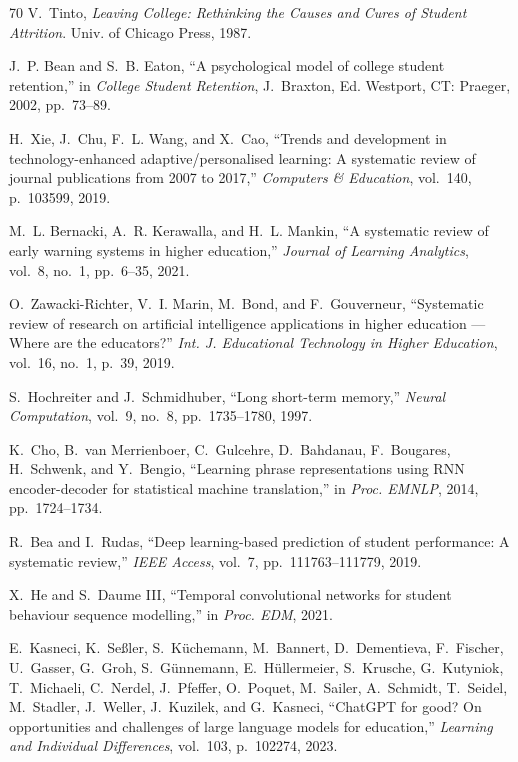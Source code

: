 \begin{thebibliography}{70}
V.~Tinto,
\textit{Leaving College: Rethinking the Causes and Cures of Student Attrition}.
Univ. of Chicago Press, 1987.

J.~P. Bean and S.~B. Eaton,
``A psychological model of college student retention,''
in \textit{College Student Retention}, J.~Braxton, Ed.
Westport, CT: Praeger, 2002, pp.~73--89.

H.~Xie, J.~Chu, F.~L. Wang, and X.~Cao,
``Trends and development in technology-enhanced adaptive/personalised learning: A systematic review of journal publications from 2007 to 2017,''
\textit{Computers \& Education}, vol.~140, p.~103599, 2019.

M.~L. Bernacki, A.~R. Kerawalla, and H.~L. Mankin,
``A systematic review of early warning systems in higher education,''
\textit{Journal of Learning Analytics}, vol.~8, no.~1, pp.~6--35, 2021.

O.~Zawacki-Richter, V.~I. Marin, M.~Bond, and F.~Gouverneur,
``Systematic review of research on artificial intelligence applications in higher education — Where are the educators?''
\textit{Int. J. Educational Technology in Higher Education}, vol.~16, no.~1, p.~39, 2019.

S.~Hochreiter and J.~Schmidhuber,
``Long short-term memory,''
\textit{Neural Computation}, vol.~9, no.~8, pp.~1735--1780, 1997.

K.~Cho, B.~van Merrienboer, C.~Gulcehre, D.~Bahdanau, F.~Bougares, H.~Schwenk, and Y.~Bengio,
``Learning phrase representations using RNN encoder-decoder for statistical machine translation,''
in \textit{Proc. EMNLP}, 2014, pp.~1724--1734.

R.~Bea and I.~Rudas,
``Deep learning-based prediction of student performance: A systematic review,''
\textit{IEEE Access}, vol.~7, pp.~111763--111779, 2019.

X.~He and S.~Daume III,
``Temporal convolutional networks for student behaviour sequence modelling,''
in \textit{Proc. EDM}, 2021.

E.~Kasneci, K.~Se{\ss}ler, S.~K{\"{u}}chemann, M.~Bannert, D.~Dementieva, F.~Fischer, U.~Gasser, G.~Groh, S.~G{\"{u}}nnemann, E.~H{\"{u}}llermeier, S.~Krusche, G.~Kutyniok, T.~Michaeli, C.~Nerdel, J.~Pfeffer, O.~Poquet, M.~Sailer, A.~Schmidt, T.~Seidel, M.~Stadler, J.~Weller, J.~Kuzilek, and G.~Kasneci,
``ChatGPT for good? On opportunities and challenges of large language models for education,''
\textit{Learning and Individual Differences}, vol.~103, p.~102274, 2023.


\end{thebibliography}
